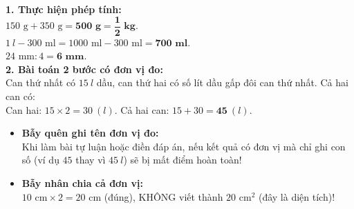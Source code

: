 \documentclass[11pt,a4paper]{article}
\begin{document}
\vspace{-2.5mm}
\noindent
\begin{minipage}[t]{0.49\textwidth}\vspace{0pt}
\begin{tcolorbox}[
  enhanced,
  colback=green!4!white,
  colframe=green!60!black,
  arc=2mm, boxrule=0.8pt,
  left=2mm, right=2mm, top=1.8mm, bottom=1.8mm,
  title={\footnotesize\bfseries\color{white}\faCheckCircle\ Ví dụ thực hành chuẩn mực}
]
{\footnotesize
\textbf{1. Thực hiện phép tính:}\\
$150\text{ g} + 350\text{ g} = \mathbf{500\text{ g}} = \mathbf{\dfrac{1}{2}\text{ kg}}$.\\
$1\ l - 300\text{ ml} = 1000\text{ ml} - 300\text{ ml} = \mathbf{700\text{ ml}}$.\\
$24\text{ mm} : 4 = \mathbf{6\text{ mm}}$.\\
\textbf{2. Bài toán 2 bước có đơn vị đo:}\\
Can thứ nhất có $15\ l$ dầu, can thứ hai có số lít dầu gấp đôi can thứ nhất. Cả hai can có:\\
Can hai: $15 \times 2 = 30\ (l)$. Cả hai can: $15 + 30 = \mathbf{45}\ (l)$.
}
\end{tcolorbox}
\end{minipage}
\hfill
\begin{minipage}[t]{0.49\textwidth}\vspace{0pt}
\begin{tcolorbox}[
  enhanced,
  colback=red!4!white,
  colframe=red!70!black,
  arc=2mm, boxrule=0.8pt,
  left=2mm, right=2mm, top=1.8mm, bottom=1.8mm,
  title={\footnotesize\bfseries\color{white}\faExclamationTriangle\ Mẹo tránh bẫy trắc nghiệm}
]
{\footnotesize
\begin{itemize}\setlength{\itemsep}{1.5pt}\setlength{\leftskip}{-2.5mm}
  \item \textbf{Bẫy quên ghi tên đơn vị đo:}\\
  Khi làm bài tự luận hoặc điền đáp án, nếu kết quả có đơn vị mà chỉ ghi con số (ví dụ $45$ thay vì $45\ l$) sẽ bị mất điểm hoàn toàn!
  \item \textbf{Bẫy nhân chia cả đơn vị:}\\
  $10\text{ cm} \times 2 = 20\text{ cm}$ (đúng), KHÔNG viết thành $20\text{ cm}^2$ (đây là diện tích)!
\end{itemize}
}
\end{tcolorbox}
\end{minipage}
\end{document}
